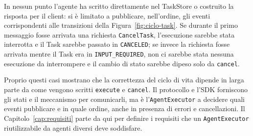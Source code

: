 In nessun punto l'agente ha scritto direttamente nel TaskStore o costruito la risposta per il client: si è limitato a pubblicare, nell'ordine, gli eventi corrispondenti alle transizioni della Figura~\ref{fig:ciclo-task}. Se durante il primo messaggio fosse arrivata una richiesta \texttt{CancelTask}, l'esecuzione sarebbe stata interrotta e il Task sarebbe passato in \texttt{CANCELED}; se invece la richiesta fosse arrivata mentre il Task era in \texttt{INPUT\_\allowbreak REQUIRED}, non ci sarebbe stata nessuna esecuzione da interrompere e il cambio di stato sarebbe dipeso solo da \texttt{cancel}.

Proprio questi casi mostrano che la correttezza del ciclo di vita dipende in larga parte da come vengono scritti \texttt{execute} e \texttt{cancel}. Il protocollo e l'SDK forniscono gli stati e il meccanismo per comunicarli, ma è l'\texttt{AgentExecutor} a decidere quali eventi pubblicare e in quale ordine, anche in presenza di errori e cancellazioni. Il Capitolo~\ref{cap:requisiti} parte da qui per definire i requisiti che un \texttt{AgentExecutor} riutilizzabile da agenti diversi deve soddisfare.
